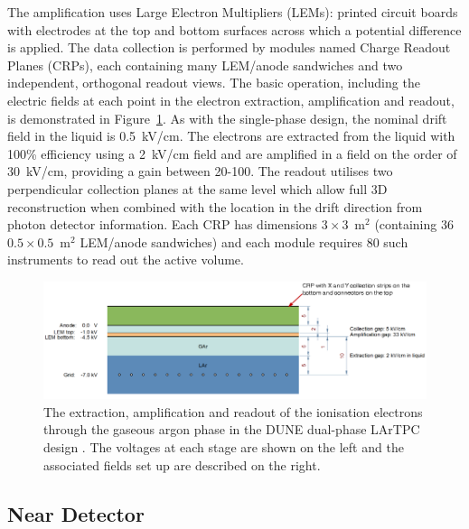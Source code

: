The amplification uses Large Electron Multipliers (LEMs): printed circuit boards with electrodes at the top and bottom surfaces across which a potential difference is applied.  The data collection is performed by modules named Charge Readout Planes (CRPs), each containing many LEM/anode sandwiches and two independent, orthogonal readout views.  The basic operation, including the electric fields at each point in the electron extraction, amplification and readout, is demonstrated in Figure~\ref{fig:DUNEDualPhaseCRP}.  As with the single-phase design, the nominal drift field in the liquid is 0.5~kV/cm.  The electrons are extracted from the liquid with 100\% efficiency using a 2~kV/cm field and are amplified in a field on the order of 30~kV/cm, providing a gain between 20-100.  The readout utilises two perpendicular collection planes at the same level which allow full 3D reconstruction when combined with the location in the drift direction from photon detector information.  Each CRP has dimensions $3\times3$~m$^2$ (containing 36 $0.5\times0.5$~m$^2$ LEM/anode sandwiches) and each module requires 80 such instruments to read out the active volume.

\begin{figure}
  \centering
  \includegraphics[width=14cm]{DUNEDualPhaseCRP.png}
  \caption[The extraction, amplification and readout of the ionisation electrons through the gaseous argon phase in the DUNE dual-phase LArTPC design.]{The extraction, amplification and readout of the ionisation electrons through the gaseous argon phase in the DUNE dual-phase LArTPC design \cite{DUNECDR4}.  The voltages at each stage are shown on the left and the associated fields set up are described on the right.}
  \label{fig:DUNEDualPhaseCRP}
\end{figure}

\subsection{Near Detector}\label{sec:NearDetector}

